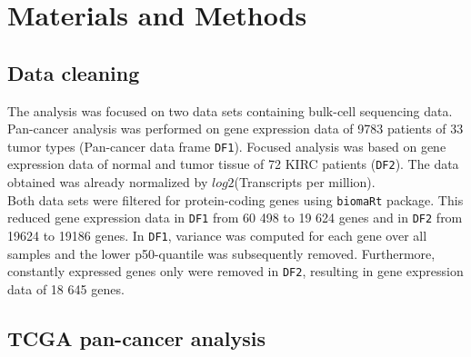 \documentclass[
  parskip,
  oneside]{scrreprt}
\begin{document}
\hypertarget{materials-and-methods}{%
\chapter{Materials and Methods}\label{materials-and-methods}}

\hypertarget{data-cleaning}{%
\section{Data cleaning}\label{data-cleaning}}

The analysis was focused on two data sets containing bulk-cell
sequencing data. Pan-cancer analysis was performed on gene expression
data of 9783 patients of 33 tumor types (Pan-cancer data frame
\texttt{DF1}). Focused analysis was based on gene expression data of
normal and tumor tissue of 72 KIRC patients (\texttt{DF2}). The data
obtained was already normalized by \(log2\)(Transcripts per million).\\
Both data sets were filtered for protein-coding genes using
\texttt{biomaRt} package. This reduced gene expression data in
\texttt{DF1} from 60 498 to 19 624 genes and in \texttt{DF2} from 19624
to 19186 genes. In \texttt{DF1}, variance was computed for each gene
over all samples and the lower p50-quantile was subsequently removed.
Furthermore, constantly expressed genes only were removed in
\texttt{DF2}, resulting in gene expression data of 18 645 genes.

\hypertarget{tcga-pan-cancer-analysis}{%
\section{TCGA pan-cancer analysis}\label{tcga-pan-cancer-analysis}}
\end{document}
